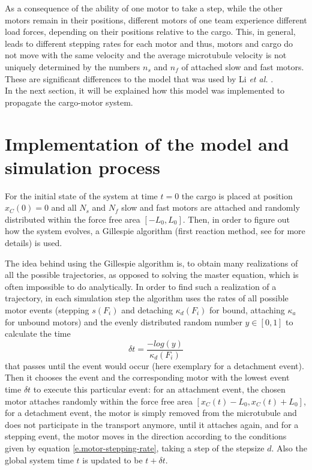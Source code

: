 As a consequence of the ability of one motor to take a step, while the other motors remain in their positions, different motors of one team experience different load forces, depending on their
positions relative to the cargo. This, in general, leads to different stepping rates for each motor and thus, motors and cargo do not move with the same velocity and the average microtubule velocity
is not uniquely determined by the numbers $n_s$ and $n_f$ of attached slow and fast motors. These are significant differences to the model that was used by Li \textit{et al.} \cite{li}. \\
In the next section, it will be explained how this model was implemented to propagate the cargo-motor system.

\section{Implementation of the model and simulation process}\label{s.implementation}
For the initial state of the system at time \mbox{$t = 0$} the cargo is placed at position \mbox{$x_{C}\left(0\right) = 0$} and all $N_s$ and $N_f$ slow and fast motors are attached and
randomly distributed within the force free area \mbox{$\left[-L_0, L_0\right]$}. Then, in order to figure out how the system evolves, a Gillespie algorithm (first reaction method, see
\cite{gillespie} for more details) is used.

The idea behind using the Gillespie algorithm is, to obtain many realizations of all the possible trajectories, as opposed to solving the master equation, which is often impossible to do
analytically. In order to find such a realization of a trajectory, in each simulation step the algorithm uses the rates of all possible motor events (stepping $s\left(F_i\right)$ and detaching
$\kappa_d\left(F_i\right)$ for bound, attaching $\kappa_a$ for unbound motors) and the evenly distributed random number \mbox{$y \in \left[0, 1\right]$} to calculate the time
\begin{equation}\label{e.event-time}
 \delta t = \frac{-log\left(y\right)}{\kappa_d\left(F_i\right)}
\end{equation}
that passes until the event would occur (here exemplary for a detachment event). Then it chooses the event and the corresponding motor with the lowest event time $\delta t$ to execute this
particular event: for an attachment event, the chosen motor attaches randomly within the force free area \mbox{$\left[x_C\left(t\right) - L_0, x_C\left(t\right) + L_0\right]$}, for a
detachment event, the motor is simply removed from the microtubule and does not participate in the transport anymore, until it attaches again, and for a stepping event, the motor moves in the
direction according to the conditions given by equation \eqref{e.motor-stepping-rate}, taking a step of the stepsize $d$. Also the global system time $t$ is updated to be \mbox{$t + \delta t$}.

